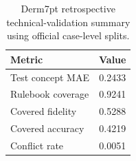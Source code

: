 \begin{table}[H]
\caption{Derm7pt retrospective technical-validation summary using official case-level splits.\label{tab:derm7pt_summary}}
\centering
\small
\begin{tabular}{lc}
\toprule
Metric & Value \\
\midrule
Test concept MAE & 0.2433 \\
Rulebook coverage & 0.9241 \\
Covered fidelity & 0.5288 \\
Covered accuracy & 0.4219 \\
Conflict rate & 0.0051 \\
\bottomrule
\end{tabular}
\end{table}
